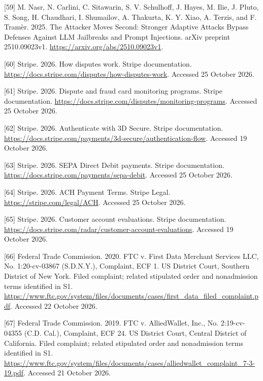 \documentclass[acmlarge,review,anonymous,nonacm]{acmart}
\newlength{\cslhangindent}
\newlength{\cslentryspacingunit} %
\newenvironment{CSLReferences}[2] %
 {\bibliofont %
  \setlength{\parindent}{0pt}
  \ifodd #1
  \let\oldpar\par
  \def\par{\hangindent=\cslhangindent\oldpar}
  \fi
  \setlength{\parskip}{#2\cslentryspacingunit}
 }%
 {}
\begin{document}
\begin{CSLReferences}{1}{1}
\leavevmode{}%
{[}59{]} M. Nasr, N. Carlini, C. Sitawarin, S. V. Schulhoff, J. Hayes,
M. Ilie, J. Pluto, S. Song, H. Chaudhari, I. Shumailov, A. Thakurta, K.
Y. Xiao, A. Terzis, and F. Tramèr. 2025. The Attacker Moves Second:
Stronger Adaptive Attacks Bypass Defenses Against LLM Jailbreaks and
Prompt Injections. arXiv preprint 2510.09023v1.
\url{https://arxiv.org/abs/2510.09023v1}.

\leavevmode{}%
{[}60{]} Stripe. 2026. How disputes work. Stripe documentation.
\url{https://docs.stripe.com/disputes/how-disputes-work}. Accessed 25
October 2026.

\leavevmode{}%
{[}61{]} Stripe. 2026. Dispute and fraud card monitoring programs.
Stripe documentation.
\url{https://docs.stripe.com/disputes/monitoring-programs}. Accessed 25
October 2026.

\leavevmode{}%
{[}62{]} Stripe. 2026. Authenticate with 3D Secure. Stripe
documentation.
\url{https://docs.stripe.com/payments/3d-secure/authentication-flow}.
Accessed 19 October 2026.

\leavevmode{}%
{[}63{]} Stripe. 2026. SEPA Direct Debit payments. Stripe documentation.
\url{https://docs.stripe.com/payments/sepa-debit}. Accessed 25 October
2026.

\leavevmode{}%
{[}64{]} Stripe. 2026. ACH Payment Terms. Stripe Legal.
\url{https://stripe.com/legal/ACH}. Accessed 25 October 2026.

\leavevmode{}%
{[}65{]} Stripe. 2026. Customer account evaluations. Stripe
documentation.
\url{https://docs.stripe.com/radar/customer-account-evaluations}.
Accessed 19 October 2026.

\leavevmode{}%
{[}66{]} Federal Trade Commission. 2020. FTC v. First Data Merchant
Services LLC, No. 1:20-cv-03867 (S.D.N.Y.), Complaint, ECF 1. US
District Court, Southern District of New York. Filed complaint; related
stipulated order and nonadmission terms identified in S1.
\url{https://www.ftc.gov/system/files/documents/cases/first_data_filed_complaint.pdf}.
Accessed 22 October 2026.

\leavevmode{}%
{[}67{]} Federal Trade Commission. 2019. FTC v. AlliedWallet, Inc., No.
2:19-cv-04355 (C.D. Cal.), Complaint, ECF 24. US District Court, Central
District of California. Filed complaint; related stipulated order and
nonadmission terms identified in S1.
\url{https://www.ftc.gov/system/files/documents/cases/alliedwallet_complaint_7-3-19.pdf}.
Accessed 21 October 2026.


\end{CSLReferences}
\end{document}
